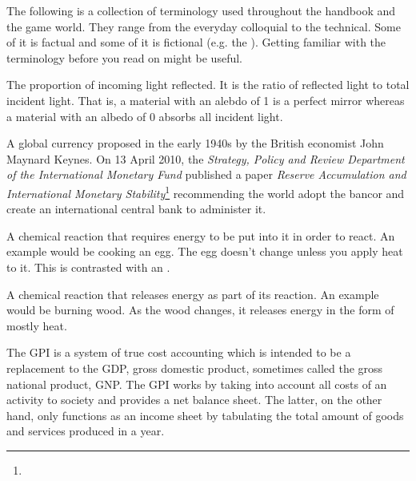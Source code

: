 

The following is a collection of terminology used throughout the handbook and the game world. They range from the everyday colloquial to the technical. Some of it is factual and some of it is fictional (e.g. the {\it \about[Jenya]}). Getting familiar with the terminology before you read on might be useful.

The proportion of incoming light reflected. It is the ratio of reflected light to total incident light. That is, a material with an alebdo of 1 is a perfect mirror whereas a material with an albedo of 0 absorbs all incident light.

A global currency proposed in the early 1940s by the British economist John Maynard Keynes. On 13 April 2010, the {\it Strategy, Policy and Review Department of the International Monetary Fund} published a paper {\it Reserve Accumulation and International Monetary Stability}\footnote{} recommending the world adopt the bancor and create an international central bank to administer it.

A chemical reaction that requires energy to be put into it in order to react. An example would be cooking an egg. The egg doesn't change unless you apply heat to it. This is contrasted with an .

A chemical reaction that releases energy as part of its reaction. An example would be burning wood. As the wood changes, it releases energy in the form of mostly heat.

The GPI is a system of true cost accounting which is intended to be a replacement to the GDP, gross domestic product, sometimes called the gross national product, GNP. The GPI works by taking into account all costs of an activity to society and provides a net balance sheet. The latter, on the other hand, only functions as an income sheet by tabulating the total amount of goods and services produced in a year. 

